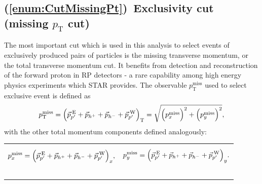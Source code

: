 \subsection{(\ref{enum:CutMissingPt})~Exclusivity cut (missing \texorpdfstring{$p_{\text{T}}$}{pT} cut)}\label{subsec:ptMiss}\label{sec:C9}%

The most important cut which is used in this analysis to select events of exclusively produced pairs of particles is the missing transverse momentum, or the total transverse momentum cut. It benefits from detection and reconstruction of the forward proton in RP detectors - a rare capability among high energy physics experiments which STAR provides. The observable $p_{\text{T}}^{\text{miss}}$ used to select exclusive event is defined as
\begin{equation}\label{eq:missingPt}
 p_{\text{T}}^{\text{miss}} = \Big( \vec{p}_{p'}^{\hspace*{2pt}\text{E}} + \vec{p}_{h^{+}} + \vec{p}_{h^{-}} + \vec{p}_{p'}^{\hspace*{2pt}\text{W}} \Big)_{\text{T}} = \sqrt{\Big(p_{x}^{\text{miss}}\Big)^{2} + \Big(p_{y}^{\text{miss}}\Big)^{2}},
\end{equation}
with the other total momentum components defined analogously:\\
\begin{tabulary}{\textwidth}{LL}
\begin{equation}\label{eq:missingPx}
 p_{x}^{\text{miss}} = \Big( \vec{p}_{p'}^{\hspace*{2pt}\text{E}} + \vec{p}_{h^{+}} + \vec{p}_{h^{-}} + \vec{p}_{p'}^{\hspace*{2pt}\text{W}} \Big)_{x},
\end{equation}~~~~~~~~~~~~~~~~~~~~~
&
\begin{equation}\label{eq:missingPy}
 p_{y}^{\text{miss}} = \Big( \vec{p}_{p'}^{\hspace*{2pt}\text{E}} + \vec{p}_{h^{+}} + \vec{p}_{h^{-}} + \vec{p}_{p'}^{\hspace*{2pt}\text{W}} \Big)_{y}.
\end{equation}~~~~~~~~~~~~~~~~~~~~~
\end{tabulary}


